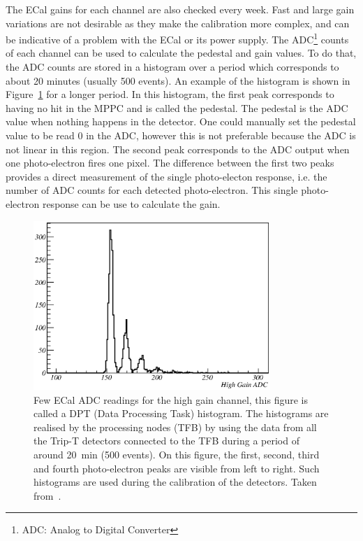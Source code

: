 The \Gls{ECal} gains for each channel are also checked every
week. Fast and large gain variations are not desirable as they make
the calibration more complex, and can be indicative of a problem with
the \Gls{ECal} or its power supply. The \Gls{ADC}\footnote{ADC: Analog
  to Digital Converter} counts of each channel can be used to
calculate the pedestal and gain values. To do that, the \Gls{ADC}
counts are stored in a histogram over a period which corresponds to
about 20 minutes (usually 500 events). An example of the histogram is
shown in Figure~\ref{fig:DPT} for a longer period.  In this histogram,
the first peak corresponds to having no hit in the \Gls{MPPC} and is
called the pedestal. The pedestal is the \Gls{ADC} value when nothing
happens in the detector. One could manually set the pedestal value to
be read $0$ in the \Gls{ADC}, however this is not preferable because
the \Gls{ADC} is not linear in this region. The second peak
corresponds to the \Gls{ADC} output when one photo-electron fires one
pixel. The difference between the first two peaks provides a direct
measurement of the single photo-electon response, i.e. the number of
\Gls{ADC} counts for each detected photo-electron. This single
photo-electron response can be use to calculate the gain.

\begin{figure}[ht]
  \begin{adjustbox}{center}
    \includegraphics[width=0.8\textwidth]{images/DataQuality/highgainraw.eps}
  \end{adjustbox}
  \caption[A DPT high gain channel histogram, ECal ADC readings
  showing the first, second, third and fourth photo-electon peaks]{Few
    \Gls{ECal} \Gls{ADC} readings for the high gain channel, this
    figure is called a \Gls{DPT} (Data Processing Task) histogram. The
    histograms are realised by the processing nodes (\Gls{TFB}) by
    using the data from all the Trip-T detectors connected to the
    \Gls{TFB} during a period of around 20~min (500 events). On this
    figure, the first, second, third and fourth photo-electron peaks
    are visible from left to right. Such histograms are used during
    the calibration of the detectors. Taken from~\cite{T2KCalib}.}
  \label{fig:DPT}
\end{figure}


